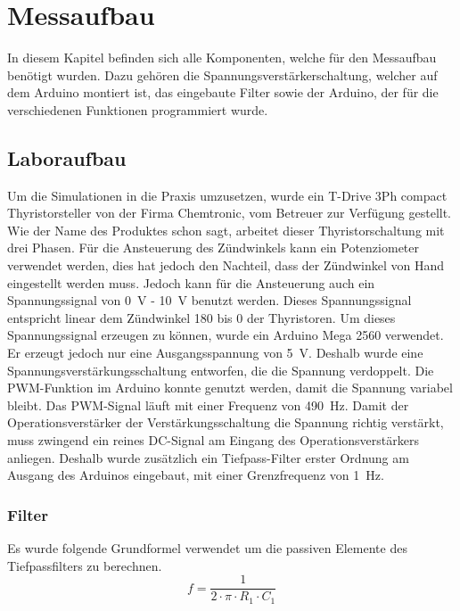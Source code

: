\section{Messaufbau}
In diesem Kapitel befinden sich alle Komponenten, welche für den Messaufbau benötigt wurden. Dazu gehören die Spannungsverstärkerschaltung, welcher auf dem Arduino montiert ist, das eingebaute Filter sowie der Arduino, der für die verschiedenen Funktionen programmiert wurde.
\subsection{Laboraufbau}
Um die Simulationen in die Praxis umzusetzen, wurde ein \grqq T-Drive 3Ph compact Thyristorsteller\grqq \hspace{0.03cm} von der Firma Chemtronic, vom Betreuer zur Verfügung gestellt. Wie der Name des Produktes schon sagt, arbeitet dieser Thyristorschaltung mit drei Phasen. Für die Ansteuerung des Zündwinkels kann ein Potenziometer verwendet werden, dies hat jedoch den Nachteil, dass der Zündwinkel von Hand eingestellt werden muss. Jedoch kann für die Ansteuerung auch ein Spannungssignal von \SI{0}{V} - \SI{10}{V} benutzt werden. Dieses Spannungssignal entspricht linear dem Zündwinkel 180\textdegree \hspace{0.02cm} bis 0\textdegree \hspace{0.02cm} der Thyristoren. Um dieses Spannungssignal erzeugen zu können, wurde ein Arduino Mega 2560 verwendet. Er erzeugt jedoch nur eine Ausgangsspannung von \SI{5}{V}. Deshalb wurde eine Spannungsverstärkungsschaltung entworfen, die die Spannung verdoppelt. Die PWM-Funktion im Arduino konnte genutzt werden, damit die Spannung variabel bleibt. Das PWM-Signal läuft mit einer Frequenz von \SI{490}{Hz}. 
Damit der Operationsverstärker der Verstärkungsschaltung die Spannung richtig verstärkt, muss zwingend ein reines DC-Signal am Eingang des Operationsverstärkers anliegen. Deshalb wurde zusätzlich ein Tiefpass-Filter erster Ordnung am Ausgang des Arduinos eingebaut, mit einer Grenzfrequenz von \SI{1}{Hz}.  


\subsubsection{Filter}
Es wurde folgende Grundformel verwendet um die passiven Elemente des Tiefpassfilters zu berechnen.
\begin{equation}
f = \frac{1}{2 \cdot \pi \cdot R_1 \cdot C_1}
\end{equation}


